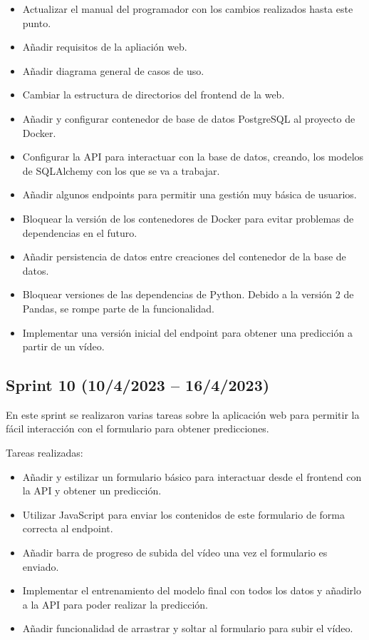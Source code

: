 \begin{itemize}
    \item Actualizar el manual del programador con los cambios realizados hasta
    este punto.
    \item Añadir requisitos de la apliación web.
    \item Añadir diagrama general de casos de uso.
    \item Cambiar la estructura de directorios del frontend de la web.
    \item Añadir y configurar contenedor de base de datos PostgreSQL al proyecto
    de Docker.
    \item Configurar la API para interactuar con la base de datos, creando, los
    modelos de SQLAlchemy con los que se va a trabajar.
    \item Añadir algunos endpoints para permitir una gestión muy básica de
    usuarios.
    \item Bloquear la versión de los contenedores de Docker para evitar
    problemas de dependencias en el futuro.
    \item Añadir persistencia de datos entre creaciones del contenedor de la
    base de datos.
    \item Bloquear versiones de las dependencias de Python. Debido a la versión
    2 de Pandas, se rompe parte de la funcionalidad.
    \item Implementar una versión inicial del endpoint para obtener una
    predicción a partir de un vídeo.
\end{itemize}

\subsection{Sprint 10 (10/4/2023 -- 16/4/2023)}

En este sprint se realizaron varias tareas sobre la aplicación web para permitir
la fácil interacción con el formulario para obtener predicciones.

Tareas realizadas:

\begin{itemize}
    \item Añadir y estilizar un formulario básico para interactuar desde el frontend con la
    API y obtener un predicción.
    \item Utilizar JavaScript para enviar los contenidos de este formulario de
    forma correcta al endpoint.
    \item Añadir barra de progreso de subida del vídeo una vez el formulario es enviado.
    \item Implementar el entrenamiento del modelo final con todos los datos y
    añadirlo a la API para poder realizar la predicción.
    \item Añadir funcionalidad de arrastrar y soltar al formulario para subir el
    vídeo.
\end{itemize}

